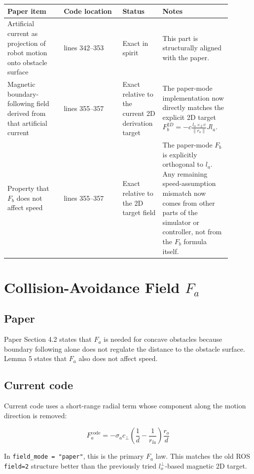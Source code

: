 \documentclass[11pt]{article}
\begin{document}
\begin{longtable}{|p{0.23\linewidth}|p{0.24\linewidth}|p{0.14\linewidth}|p{0.29\linewidth}|}
\hline
\textbf{Paper item} & \textbf{Code location} & \textbf{Status} & \textbf{Notes} \\
\hline
Artificial current as projection of robot motion onto obstacle surface & lines 342--353 & Exact in spirit & This part is structurally aligned with the paper. \\
\hline
Magnetic boundary-following field derived from that artificial current & lines 355--357 & Exact relative to the current 2D derivation target & The paper-mode implementation now directly matches the explicit 2D target \(F_b^{2D} = -c \frac{l_o \times_2 v}{\|r_o\|} J l_a\). \\
\hline
Property that \(F_b\) does not affect speed & lines 355--357 & Exact relative to the 2D target field & The paper-mode \(F_b\) is explicitly orthogonal to \(l_a\). Any remaining speed-assumption mismatch now comes from other parts of the simulator or controller, not from the \(F_b\) formula itself. \\
\hline
\end{longtable}

\section*{Collision-Avoidance Field \(F_a\)}

\subsection*{Paper}

Paper Section 4.2 states that \(F_a\) is needed for concave obstacles because
boundary following alone does not regulate the distance to the obstacle
surface. Lemma 5 states that \(F_a\) also does not affect speed.

\subsection*{Current code}

Current code uses a short-range radial term whose component along the motion
direction is removed:

\begin{equation}
F_a^{\text{code}} =
-\sigma_a c_{\perp}
\left(
\frac{1}{d} - \frac{1}{r_{la}}
\right)
\frac{r_o}{d}
\end{equation}

In \texttt{field\_mode = "paper"}, this is the primary \(F_a\) law. This
matches the old ROS \texttt{field=2} structure better than the previously tried
\(l_o^\perp\)-based magnetic 2D target.
\end{document}
